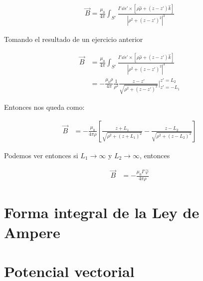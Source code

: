 \documentclass[11pt]{report}
\theoremstyle{plain}
\theoremstyle{definition}
\begin{document}
\begin{align*} %
	\vec{B} = \frac{\mu_0}{4\pi}\int_{S'} \frac{I'\dd{s'}\times\left[\rho\hat{\rho} + \left(z- z'\right)\hat{k}\right]}{|\rho^2 + \left(z- z'\right)^2|^3}
\end{align*}

Tomando el resultado de un ejercicio anterior

\begin{align*} %
	\vec{B} &= \frac{\mu_0}{4\pi}\int_{S'} \frac{I'\dd{s'}\times\left[\rho\hat{\rho} + \left(z- z'\right)\hat{k}\right]}{|\rho^2 + \left(z- z'\right)^2|^3}\\
	&=  -\frac{\mu_0\rho}{4\pi}\frac{1}{\rho^2} \frac{z-z'}{\sqrt{\rho^2 + (z-z')^2}}|^{z' = L_2}_{z' = -L_1}
\end{align*}

Entonces nos queda como:

\begin{align*} %
	\vec{B} &=  -\frac{\mu_0}{4\pi\rho}\left[\frac{z+L_1}{\sqrt{\rho^2 + (z+L_1)^2}}- \frac{z-L_2}{\sqrt{\rho^2 + (z-L_2)^2}}\right]
\end{align*}


Podemos ver entonces si $L_1 \rightarrow \infty$ y $L_2 \rightarrow \infty$, entonces

\begin{align*} %
	\vec{B} &=  -\frac{\mu_0I'\hat{\varphi}}{4\pi\rho}
\end{align*}






\chapter{Forma integral de la Ley de Ampere}


\chapter{Potencial vectorial}

\end{document}
